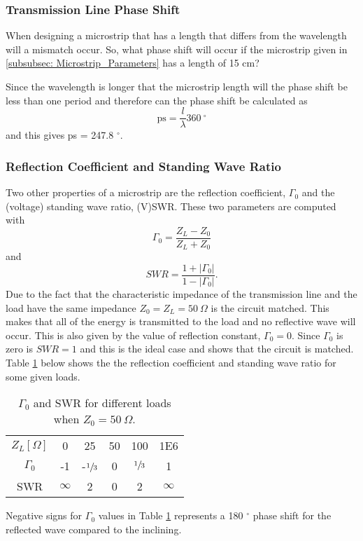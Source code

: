 \documentclass[report.tex]{subfiles}
\begin{document}
\subsubsection{Transmission Line Phase Shift}\label{subsubsec: Lab1 Phase Shift}
When designing a microstrip that has a length that differs from the wavelength will a mismatch occur. So, what phase shift will occur if the microstrip given in \ref{subsubsec: Microstrip_Parameters} has a length of 15 cm?

Since the wavelength is longer that the microstrip length will the phase shift be less than one period and therefore can the phase shift be calculated as
\begin{equation}
	\text{ps} = \dfrac{l}{\lambda} 360 \:^\circ
\end{equation}
and this gives ps = 247.8 $^\circ$.
\subsubsection{Reflection Coefficient and Standing Wave Ratio}
Two other properties of a microstrip are the reflection coefficient, $\Gamma_0$ and the (voltage) standing wave ratio, (V)SWR. These two parameters are computed with
\begin{equation}
	\Gamma_0 = \dfrac{Z_L - Z_0}{Z_L + Z_0}
\end{equation}
and
\begin{equation}
	SWR = \dfrac{1 + \left|\Gamma_0\right|}{1 - \left|\Gamma_0\right|}\text{.}
\end{equation}
Due to the fact that the characteristic impedance of the transmission line and the load have the same impedance $Z_0 = Z_L = 50\:\Omega$ is the circuit matched. This makes that all of the energy is transmitted to the load and no reflective wave will occur. This is also given by the value of reflection constant, $\Gamma_0 = 0\text{.}$ Since $\Gamma_0$ is zero is $SWR = 1$ and this is the ideal case and shows that the circuit is matched. Table \ref{table: RC and SWR} below shows the the reflection coefficient and standing wave ratio for some given loads.
\begin{table}\label{table: RC and SWR}
    \centering
    \caption{$\Gamma_0$ and SWR for different loads when $Z_0= 50\: \Omega$.}
    \begin{tabular}{c | c c c c c}
         $Z_L [\Omega]$ & 0 & 25 & 50 & 100 & 1E6 \\
         $\Gamma_0$ & -1 & -$\sfrac{1}{3}$ & 0 & $\sfrac{1}{3}$ & 1 \\
         SWR & $\infty$ & 2 & 0 & 2 & $\infty$
    \end{tabular}
\end{table}
Negative signs for $\Gamma_0$ values in Table \ref{table: RC and SWR} represents a 180 $^\circ$ phase shift for the reflected wave compared to the inclining.
\end{document}
